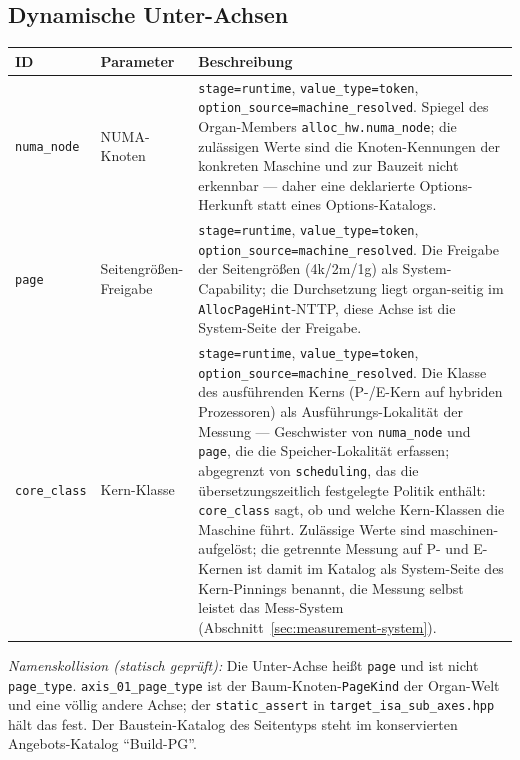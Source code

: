 \subsection*{Dynamische Unter-Achsen}

\begin{scriptsize}
\begin{longtable}{@{}>{\raggedright\arraybackslash}p{1.8cm} >{\raggedright\arraybackslash}p{3.2cm} >{\raggedright\arraybackslash}p{8.5cm}@{}}
\toprule
ID & Parameter & Beschreibung \\
\midrule
\endhead%
\texttt{numa\_\allowbreak{}node} & NUMA-Knoten & \texttt{stage=runtime}, \texttt{value\_\allowbreak{}type=token}, \texttt{option\_\allowbreak{}source=machine\_\allowbreak{}resolved}. Spiegel des Organ-Members \texttt{alloc\_\allowbreak{}hw.numa\_\allowbreak{}node}; die zulässigen Werte sind die Knoten-Kennungen der konkreten Maschine und zur Bauzeit nicht erkennbar --- daher eine deklarierte Options-Herkunft statt eines Options-Katalogs. \\
\texttt{page} & Seitengrößen-Freigabe & \texttt{stage=runtime}, \texttt{value\_\allowbreak{}type=token}, \texttt{option\_\allowbreak{}source=machine\_\allowbreak{}resolved}. Die Freigabe der Seitengrößen (4k/\allowbreak{}2m/\allowbreak{}1g) als System-Capability; die Durchsetzung liegt organ-seitig im \texttt{Alloc\allowbreak{}Page\allowbreak{}Hint}-NTTP, diese Achse ist die System-Seite der Freigabe. \\
\texttt{core\_\allowbreak{}class} & Kern-Klasse & \texttt{stage=runtime}, \texttt{value\_\allowbreak{}type=token}, \texttt{option\_\allowbreak{}source=machine\_\allowbreak{}resolved}. Die Klasse des ausführenden Kerns (P-/\allowbreak{}E-Kern auf hybriden Prozessoren) als Ausführungs-Lokalität der Messung --- Geschwister von \texttt{numa\_\allowbreak{}node} und \texttt{page}, die die Speicher-Lokalität erfassen; abgegrenzt von \texttt{scheduling}, das die übersetzungszeitlich festgelegte Politik enthält: \texttt{core\_\allowbreak{}class} sagt, ob und welche Kern-Klassen die Maschine führt. Zulässige Werte sind maschinen-aufgelöst; die getrennte Messung auf P- und E-Kernen ist damit im Katalog als System-Seite des Kern-Pinnings benannt, die Messung selbst leistet das Mess-System (Abschnitt~\ref{sec:measurement-system}). \\
\bottomrule
\end{longtable}
\end{scriptsize}

\emph{Namenskollision (statisch geprüft):} Die Unter-Achse heißt \texttt{page} und ist nicht \texttt{page\_\allowbreak{}type}. \texttt{axis\_\allowbreak{}01\_\allowbreak{}page\_\allowbreak{}type} ist der Baum-Knoten-\texttt{Page\allowbreak{}Kind} der Organ-Welt und eine völlig andere Achse; der \texttt{static\_\allowbreak{}assert} in \texttt{target\_\allowbreak{}isa\_\allowbreak{}sub\_\allowbreak{}axes.hpp} hält das fest. Der Baustein-Katalog des Seitentyps steht im konservierten Angebots-Katalog \enquote{Build-PG}.

